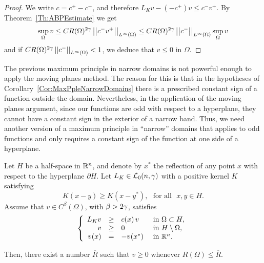 \begin{proof}
	We write $c= c^+ - c^-$, and therefore $L_K v -(-c^+)v \leq c^- v^+	$. By Theorem~\ref{Th:ABPEstimate} we get
	$$
	\sup_\Omega v \leq C R(\Omega)^{2\gamma} \left | \left |{c^- v^+} \right | \right |_{L^\infty(\Omega)} \leq C R(\Omega)^{2\gamma} \left | \left |{c^-} \right | \right |_{L^\infty(\Omega)} \sup_\Omega v
	$$
	and if $C R(\Omega)^{2\gamma} \left | \left |{c^-} \right | \right |_{L^\infty(\Omega)}  <1 $, we deduce that $v\leq 0$ in $\Omega$.
\end{proof}


The previous maximum principle in narrow domains is not powerful enough to apply the moving planes method. The reason for this is that in the hypotheses of Corollary~\ref{Cor:MaxPpleNarrowDomains} there is a prescribed constant sign of a function outside the domain. Nevertheless, in the application of the moving planes argument, since our functions are odd with respect to a hyperplane, they cannot have a constant sign in the exterior of a narrow band. Thus, we need another version of a maximum principle in ``narrow'' domains that applies to odd functions and only requires a constant sign of the function at one side of a hyperplane.

\begin{proposition}
	\label{Prop:MaxPrpNarrowOdd}
	Let $H$ be a half-space in $\mathbb{R}^n$, and denote by $x^*$ the reflection of any point $x$ with respect to the hyperplane $\partial H$. Let $L_K \in \mathcal{L}_0(n,\gamma)$ with a positive kernel $K$ satisfying
	\begin{equation}
	\label{Eq:KernelSymmetry}
	K(x-y) \geq K(x-y^*), \,\,\,\,\text{for all } \,\, x,y\in H.
	\end{equation}
	Assume that $v\in C^{\beta}(\Omega)$, with $\beta > 2\gamma$, satisfies
	\begin{equation*}
	\left\{\begin{array}{rcll}
	L_K  v &\geq& c(x)\,v  &\textrm{ in } \Omega\subset H,\\
	v &\geq& 0 &\textrm{ in } H\setminus\Omega,\\
	v(x) &=& -v(x^*) &\textrm{ in } \mathbb{R}^n.
	\end{array} \right.
	\end{equation*}
	
	Then, there exist a number $\overline{R}$ such that $v \geq 0$ whenever $R(\Omega) \leq \overline{R}$.
\end{proposition}

